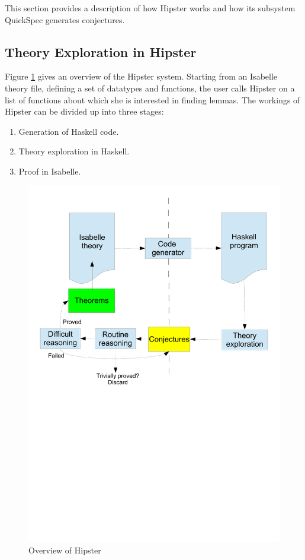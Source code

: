 \label{sec:background}
This section provides a description of how Hipster works and how its subsystem QuickSpec generates conjectures.

\subsection{Theory Exploration in Hipster}
Figure \ref{fig:hipster} gives an overview of the Hipster system.
%
Starting from an Isabelle theory file, defining a set of datatypes and functions, the user calls Hipster on a list of functions about which she is interested in finding lemmas.
%
The workings of Hipster can be divided up into three stages:
\begin{enumerate}
\item Generation of Haskell code. 
\item Theory exploration in Haskell.
\item Proof in Isabelle.
\end{enumerate}

\begin{figure}[htbp]
\begin{center}
\includegraphics[scale=0.4]{hipster}
\caption{Overview of Hipster}
\label{fig:hipster}
\end{center}
\end{figure}

